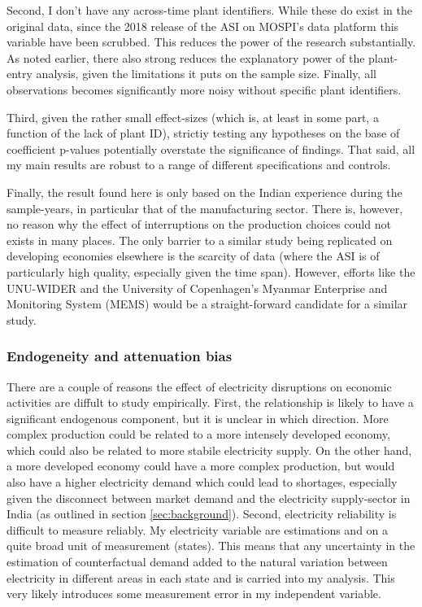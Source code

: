 \documentclass[11pt]{article}
\begin{document}
Second, I don't have any across-time plant identifiers. While these do exist in the original data, since the 2018 release of the ASI on MOSPI's data platform this variable have been scrubbed. This reduces the power of the research substantially. As noted earlier, there also strong reduces the explanatory power of the plant-entry analysis, given the limitations it puts on the sample size. Finally, all observations becomes significantly more noisy without specific plant identifiers. 

Third, given the rather small effect-sizes (which is, at least in some part, a function of the lack of plant ID), strictiy testing any hypotheses on the base of coefficient p-values potentially overstate the significance of findings. That said, all my main results are robust to a range of different specifications and controls.

Finally, the result found here is only based on the Indian experience during the sample-years, in particular that of the manufacturing sector. There is, however, no reason why the effect of interruptions on the production choices could not exists in many places. The only barrier to a similar study being replicated on developing economies elsewhere is the scarcity of data (where the ASI is of particularly high quality, especially given the time span). However, efforts like the UNU-WIDER and the University of Copenhagen's Myanmar Enterprise and Monitoring System (MEMS) would be a straight-forward candidate for a similar study.

\subsubsection{Endogeneity and attenuation bias}
\label{sec:orgd4457e7}
There are a couple of reasons the effect of electricity disruptions on economic activities are diffult to study empirically. First, the relationship is likely to have a significant endogenous component, but it is unclear in which direction. More complex production could be related to a more intensely developed economy, which could also be related to more stabile electricity supply. On the other hand, a more developed economy could have a more complex production, but would also have a higher electricity demand which could lead to shortages, especially given the disconnect between market demand and the electricity supply-sector in India (as outlined in section \ref{sec:background}). Second, electricity reliability is difficult to measure reliably. My electricity variable are estimations and on a quite broad unit of measurement (states). This means that any uncertainty in the estimation of counterfactual demand added to the natural variation between electricity in different areas in each state and is carried into my analysis. This very likely introduces some measurement error in my independent variable.
\end{document}
